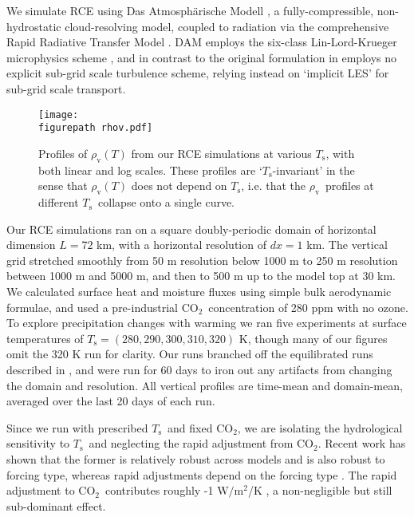 \documentclass[9pt,twocolumn,twoside,lineno]{pnas-new}
\newcommand{\cotwo}{\ensuremath{\mathrm{CO_2}}}
\newcommand{\Wmsq}{\ensuremath{\mathrm{W/m^2}}}
\newcommand{\rhov}{\ensuremath{\rho_\mathrm{v}}}
\newcommand{\Ts}{\ensuremath{T_\mathrm{s}}}
\newcommand{\figurepath}{../../figures/}
\begin{document}
We simulate RCE using Das Atmosph\"arische Modell \cite[DAM,][]{romps2008}, a fully-compressible, non-hydrostatic cloud-resolving model, coupled to radiation via the comprehensive Rapid Radiative Transfer Model 
\cite[RRTM,][]{mlawer1997}. DAM employs the six-class Lin-Lord-Krueger  microphysics scheme \cite{lin1983, lord1984, krueger1995}, and in contrast to the original formulation in \cite{romps2008} employs no explicit sub-grid scale turbulence scheme, relying instead on `implicit LES'  \citep[][essentially just the existing numerical diffusion]{margolin2006}  for sub-grid scale transport.

\begin{figure}[t]
	\begin{center}
			\texttt{[image: \\figurepath rhov.pdf]}
		\caption{Profiles of $\rhov(T)$ from our RCE simulations at various \Ts, with both linear and log scales. These profiles are `\Ts-invariant' in the sense that $\rhov(T)$ does not depend on \Ts, i.e. that the \rhov\ profiles at different \Ts\ collapse onto a single curve.
		\label{rhov_fig}
		}
	\end{center}
\end{figure}

	
	Our RCE simulations ran on a square doubly-periodic domain of horizontal dimension $L=72$ km, with  a horizontal resolution of $dx=1$ km. The vertical grid stretched smoothly from 50 m resolution below 1000 m to 250 m resolution between 1000 m and 5000 m, and then to 500 m up to the model top at  30 km. We calculated surface heat and moisture fluxes using simple bulk aerodynamic formulae, and used a pre-industrial \cotwo\  concentration of 280 ppm with no ozone. To explore precipitation changes  with warming we ran five experiments at surface temperatures of $\Ts=(280,290,300,310,320)$ K, though many of our figures omit the 320 K run for clarity. Our runs branched off the equilibrated runs described in \cite{romps2014}, and were run for 60 days  to iron out any artifacts from changing the domain and resolution. All vertical profiles are time-mean and domain-mean, averaged over the last 20 days of each run. 
	
Since we run with prescribed \Ts\ and fixed \cotwo, we are isolating the hydrological sensitivity to \Ts\ and neglecting the rapid adjustment from \cotwo.  Recent work has shown that the former is relatively robust across models and is also robust to forcing type, whereas rapid adjustments depend on the forcing type \cite{flaschner2016,samset2017}. The rapid adjustment to \cotwo\ contributes roughly -1 \Wmsq/K \cite{pendergrass2014}, a non-negligible but still sub-dominant effect. 
\end{document}
